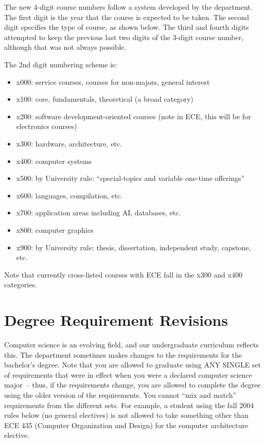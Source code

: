 \documentclass[10pt,letter]{book}
\newenvironment{itemlist}{
\begin{itemize}
\setlength{\itemsep}{0pt}
\setlength{\parskip}{0pt}}
{\end{itemize}}
\newcommand{\mysection}[1]{\section{#1}\renewcommand{\rightmark}{#1}}
\begin{document}
The new 4-digit course numbers follow a system developed by the
department. The first digit is the year that the course is expected
to be taken. The second digit specifies the type of course, as shown
below. The third and fourth digits attempted to keep the previous
last two digits of the 3-digit course number, although that was not
always possible. 


The 2nd digit numbering scheme is:

\begin{itemlist}
\item x000: service courses, courses for non-majors, general interest
\item x100: core, fundamentals, theoretical (a broad category)
\item x200: software development-oriented courses (note in ECE, this will
 be for electronics courses)
\item x300: hardware, architecture, etc.
\item x400: computer systems
\item x500: by University rule: ``special-topics and variable one-time
 offerings''
\item x600: languages, compilation, etc.
\item x700: application areas including AI, databases, etc.
\item x800: computer graphics
\item x900: by University rule: thesis, dissertation, independent
 study, capstone, etc.
\end{itemlist}

Note that currently cross-listed courses with ECE fall in the x300 and
x400 categories.

\mysection{Degree Requirement Revisions}
\label{sec:degreerevisions}

Computer science is an evolving field, and our undergraduate
curriculum reflects this. The department sometimes makes changes to
the requirements for the bachelor's degree. Note that you are allowed
to graduate using ANY SINGLE set of requirements that were in effect
when you were a declared computer science major~-- thus, if the
requirements change, you are allowed to complete the degree using the
older version of the requirements. You cannot ``mix and match''
requirements from the different sets. For example, a student using the
fall 2004 rules below (no general electives) is not allowed to take
something other than ECE 435 (Computer Organization and Design) for
the computer architecture elective. 
\end{document}
